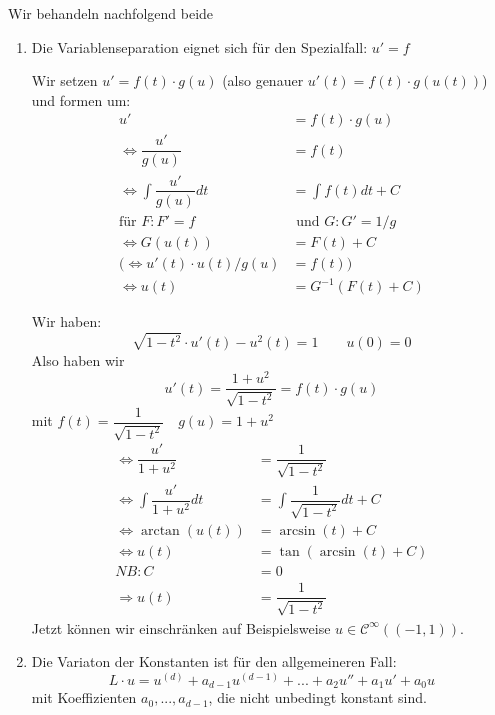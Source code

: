 \documentclass[main.tex]{subfiles}
\begin{document}
Wir behandeln nachfolgend beide

\begin{enumerate}
  \item Die Variablenseparation eignet sich für den Spezialfall: $u' = f$

    Wir setzen $u' = f(t) \cdot g(u)$ (also genauer $u'(t) = f(t) \cdot g(u(t))$) und formen um:
    $$  \begin{aligned}
      u' & = f(t) \cdot g(u) \\
      \Leftrightarrow \dfrac{u'}{g(u)} & = f(t) \\
      \Leftrightarrow \int \dfrac{u'}{g(u)} dt & = \int f(t) dt + C\\
      \text{für $F: F' = f$} & \text{ und $G: G' = 1/g$} \\
      \Leftrightarrow G(u(t)) & = F(t) + C \\
      (\Leftrightarrow u'(t) \cdot u(t)/g(u) & = f(t)) \\
      \Leftrightarrow u(t) & = G^{-1}(F(t) + C)
    \end{aligned}$$

    \begin{Beispiel}[15.26 im Skript]
      Wir haben:
      $$\sqrt{1 - t^2} \cdot u'(t) - u^2(t) = 1 \qquad u(0) = 0$$
      Also haben wir
      $$u'(t) = \dfrac{1 + u^2}{\sqrt{1 -t^2}} = f(t)\cdot g(u)$$
      mit $f(t) = \dfrac{1}{\sqrt{1 -t^2}} \quad g(u) = 1 + u^2$
      $$\begin{aligned}
        \Leftrightarrow \dfrac{u'}{1 + u^2} & = \dfrac{1}{\sqrt{1 -t^2}} \\
        \Leftrightarrow \int \dfrac{u'}{1 + u^2} dt & = \int \dfrac{1}{\sqrt{1 -t^2}} dt + C\\
        \Leftrightarrow \arctan(u(t)) & = \arcsin(t) + C \\
        \Leftrightarrow u(t) & = \tan(\arcsin(t) + C) \\
        NB: C & = 0 \\
        \Rightarrow u(t) & = \dfrac{1}{\sqrt{1 - t^2}}
      \end{aligned}$$
      Jetzt können wir einschränken auf Beispielsweise $u \in \mathcal{C}^\infty((-1,1))$.
    \end{Beispiel}

  \item Die Variaton der Konstanten ist für den allgemeineren Fall:
    $$L \cdot u = u^{(d)} + a_{d-1} u^{(d-1)} + ... + a_2 u'' + a_1 u' + a_0 u$$
    mit Koeffizienten $a_0, ..., a_{d-1}$, die nicht unbedingt konstant sind.


\end{enumerate}
\end{document}
